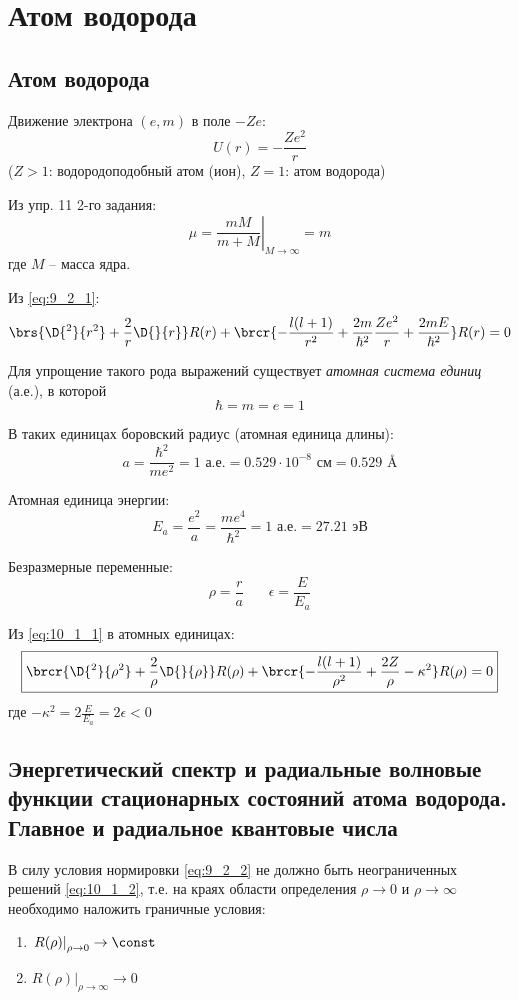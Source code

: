 \chapter{Атом водорода}
\section{Атом водорода}

Движение электрона $(e,m)$ в поле $-Ze$:
$$
U(r) = -\frac{Ze^2}{r}
$$
($Z>1$: водородоподобный атом (ион), $Z=1$: атом водорода)

Из упр. 11 2-го задания:
$$
\mu = \left. \frac{m M}{m + M} \right|_{M \to \infty} = m
$$
где $M$ -- масса ядра.

Из \eqref{eq:9_2_1}:
\begin{equation}
\label{eq:10_1_1}
\brs{\D{^2}{r^2} + \frac{2}{r}\D{}{r}} R(r) + 
\brcr{-\frac{l(l+1)}{r^2} + \frac{2m}{\hbar^2}\frac{Ze^2}{r} + \frac{2mE}{\hbar^2}} R(r) = 0
\end{equation}

Для упрощение такого рода выражений существует \textit{атомная система единиц} (а.е.), в которой
$$
\hbar = m = e = 1
$$

В таких единицах боровский радиус (атомная единица длины):
$$
a = \frac{\hbar^2}{me^2} = 1\text{~а.е.} = 0.529 \cdot 10^{-8} \text{~см} = 0.529 \text{~\AA}
$$

Атомная единица энергии:
$$
E_a = \frac{e^2}{a} = \frac{me^4}{\hbar^2} = 1 \text{~а.е.} = 27.21 \text{~эВ}
$$

Безразмерные переменные:
$$
\rho = \frac{r}{a} ~~~~~~~~ \epsilon = \frac{E}{E_a}
$$

Из \eqref{eq:10_1_1} в атомных единицах:
\begin{equation}
\label{eq:10_1_2}
\boxed{
	\brcr{\D{^2}{\rho^2} + \frac{2}{\rho} \D{}{\rho}} R(\rho) + \brcr{-\frac{l(l+1)}{\rho^2} + \frac{2Z}{\rho} - \kappa^2} R(\rho) = 0
}
\end{equation}
где $-\kappa^2 = 2 \frac{E}{E_a} = 2 \epsilon < 0$

\section{Энергетический спектр и радиальные волновые функции стационарных состояний атома водорода. Главное и радиальное квантовые числа}

В силу условия нормировки \eqref{eq:9_2_2} не должно быть неограниченных решений \eqref{eq:10_1_2}, т.е. на краях области определения $\rho \to 0$ и $\rho \to \infty$ необходимо наложить граничные условия:
\begin{enumerate}
\item $\left. R(\rho)\right|_{\rho \to 0} \to \const$
\item $\left. R(\rho)\right|_{\rho \to \infty} \to 0$
\end{enumerate}


